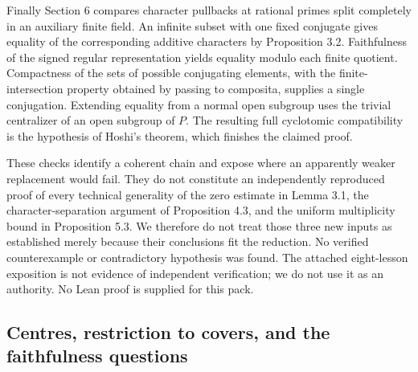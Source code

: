 Finally Section 6 compares character pullbacks at rational primes split
completely in an auxiliary finite field.  An infinite subset with one fixed
conjugate gives equality of the corresponding additive characters by
Proposition 3.2.  Faithfulness of the signed regular representation yields
equality modulo each finite quotient.  Compactness of the sets of possible
conjugating elements, with the finite-intersection property obtained by
passing to composita, supplies a single conjugation.  Extending equality
from a normal open subgroup uses the trivial centralizer of an open subgroup
of $P$.  The resulting full cyclotomic compatibility is the hypothesis of
Hoshi's theorem, which finishes the claimed proof.

These checks identify a coherent chain and expose where an apparently weaker
replacement would fail.  They do not constitute an independently reproduced
proof of every technical generality of the zero estimate in Lemma 3.1, the
character-separation argument of Proposition 4.3, and the uniform multiplicity
bound in Proposition 5.3.  We therefore do not treat those three new inputs
as established merely because their conclusions fit the reduction.  No
verified counterexample or contradictory hypothesis was found.  The attached
eight-lesson exposition is not evidence of independent verification; we do
not use it as an authority.  No Lean proof is supplied for this pack.

\subsection{Centres, restriction to covers, and the faithfulness questions}

